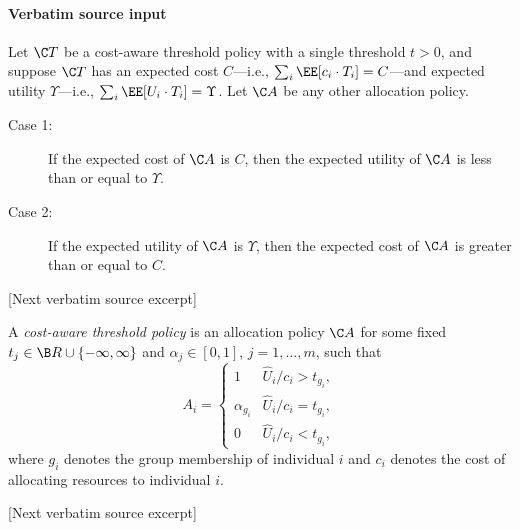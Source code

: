 \documentclass[10pt]{article}
\begin{document}
\paragraph{Verbatim source input}
\begin{ReviewVerbatim}
\begin{lem}
\label{lem:main}
    Let \(\C T\) be a cost-aware threshold policy with a single threshold \(t > 0\), and suppose \(\C T\) has an expected cost \(C\)---i.e., \(\sum_i \EE [c_i \cdot T_i] = C\)---and expected utility \(\Upsilon\)---i.e., \(\sum_i \EE [U_i \cdot T_i] = \Upsilon\). Let \(\C A\) be any other allocation policy.
    \begin{description}
        \item[Case 1:] If the expected cost of \(\C A\) is \(C\), then the expected utility of \(\C A\) is less than or equal to \(\Upsilon\).
        \item[Case 2:] If the expected utility of \(\C A\) is \(\Upsilon\), then the expected cost of \(\C A\) is greater than or equal to \(C\).
    \end{description}
\end{lem}

[Next verbatim source excerpt]

\begin{defn}
    A \emph{cost-aware threshold policy} is an allocation policy \(\C A\) for some fixed \(t_j \in \B R \cup \{-\infty, \infty\}\) and \(\alpha_j \in [0,1]\), \(j = 1, \ldots, m\), such that
        \begin{equation*}
            A_i = \begin{cases}
                1 & \hat U_i / c_i > t_{g_i},\\
                \alpha_{g_i} & \hat U_i / c_i = t_{g_i}, \\
                0 & \hat U_i / c_i < t_{g_i},
            \end{cases}
        \end{equation*}
    where \(g_i\) denotes the group membership of individual \(i\) and \(c_i\) denotes the cost of allocating resources to individual \(i\).
\end{defn}

[Next verbatim source excerpt]


\end{ReviewVerbatim}
\end{document}
